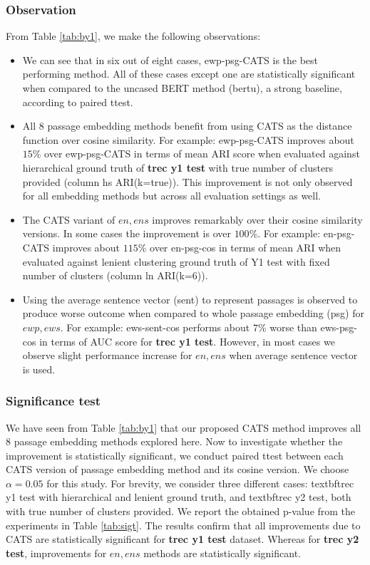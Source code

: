 \subsubsection{Observation} From Table \ref{tab:by1}, we make the following observations:
\begin{itemize}[leftmargin=.15in]
    \item We can see that in six out of eight cases, ewp-psg-CATS is the best performing method. All of these cases except one are statistically significant when compared to the uncased BERT method (bertu), a strong baseline, according to paired ttest.
    \item All $8$ passage embedding methods benefit from using CATS as the distance function over cosine similarity. For example: ewp-psg-CATS improves about $15$\% over ewp-psg-CATS in terms of mean ARI score when evaluated against hierarchical ground truth of \textbf{trec y1 test} with true number of clusters provided (column hs ARI(k=true)). This improvement is not only observed for all embedding methods but across all evaluation settings as well.
    \item The CATS variant of $en, ens$ improves remarkably over their cosine similarity versions. In some cases the improvement is over $100$\%. For example: en-psg-CATS improves about $115$\% over en-psg-cos in terms of mean ARI when evaluated against lenient clustering ground truth of Y1 test with fixed number of clusters (column ln ARI(k=6)).
    \item Using the average sentence vector (sent) to represent passages is observed to produce worse outcome when compared to whole passage embedding (psg) for $ewp, ews$. For example: ews-sent-cos performs about $7$\% worse than ews-psg-cos in terms of AUC score for \textbf{trec y1 test}. However, in most cases we observe slight performance increase for $en, ens$ when average sentence vector is used.
\end{itemize}

\subsubsection{Significance test} We have seen from Table \ref{tab:by1} that our proposed CATS method improves all $8$ passage embedding methods explored here. Now to investigate whether the improvement is statistically significant, we conduct paired ttest between each CATS version of passage embedding method and its cosine version. We choose $\alpha = 0.05$ for this study. For brevity, we consider three different cases: textbf{trec y1 test} with hierarchical and lenient ground truth, and textbf{trec y2 test}, both with true number of clusters provided. We report the obtained p-value from the experiments in Table \ref{tab:sigt}. The results confirm that all improvements due to CATS are statistically significant for \textbf{trec y1 test} dataset. Whereas for \textbf{trec y2 test}, improvements for $en, ens$ methods are statistically significant.

